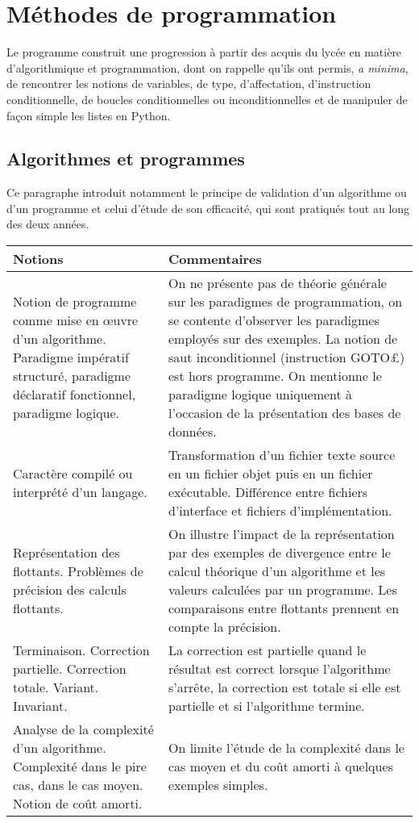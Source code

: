 \section{Méthodes de programmation \semUn \semDeux \semTroisQuatre}

Le programme construit une progression à partir des acquis du lycée en matière d'algorithmique et programmation, dont on rappelle qu'ils ont permis, \textit{a minima}, de rencontrer les notions de variables, de type, d'affectation, d'instruction conditionnelle, de boucles conditionnelles ou inconditionnelles et de manipuler de façon simple les listes en Python. 


\subsection{Algorithmes et programmes \semUn}
Ce paragraphe introduit notamment le principe de validation d'un algorithme ou d'un programme et celui d'étude de son efficacité, qui sont pratiqués tout au long des deux années.

\begin{longtable}{|p{\lnotion}|p{\comment}|}
    \hline
    \textbf{Notions} & \textbf{Commentaires} \\
    \hline \hline
    Notion de programme comme mise en \oe uvre d'un algorithme. Paradigme impératif structuré, paradigme déclaratif fonctionnel, paradigme logique.
    & 
    On ne présente pas de théorie générale sur les paradigmes de programmation, on se contente d'observer les paradigmes employés sur des exemples. La notion de saut inconditionnel (instruction \£GOTO£) est hors programme. On mentionne le paradigme logique uniquement à l'occasion de la présentation des bases de données. 
    \\
    \hline 
    Caractère compilé ou interprété d'un langage.
    & Transformation d'un fichier texte source en un fichier objet puis en un fichier exécutable. Différence entre fichiers d'interface et fichiers d'implémentation. 
    \\
    \hline
        Représentation des flottants. Problèmes de précision des calculs flottants.
        &
        On illustre l'impact de la représentation par des exemples de divergence
          entre le calcul théorique d'un algorithme et les valeurs calculées par un
          programme. Les comparaisons entre flottants prennent en compte la
          précision.
        \\
    \hline
    Terminaison. Correction partielle. Correction totale. Variant. Invariant.
    &
    La correction est partielle quand le résultat est correct lorsque l'algorithme s'arrête, la correction est totale si elle est partielle et si l'algorithme termine.
    \\
    \hline
    Analyse de la complexité d'un algorithme. Complexité dans le pire cas, dans le cas moyen. Notion de coût amorti. &
    On limite l'étude de la complexité dans le cas moyen et du coût amorti à quelques exemples simples.
    \\
    \hline
    \end{longtable}


